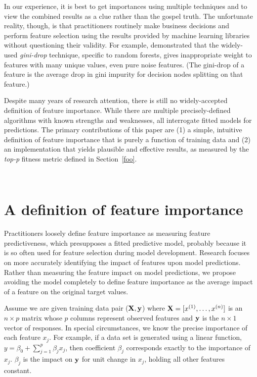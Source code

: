 \documentclass[12pt]{article}
\newcommand{\secref}[1]{Section~\ref{#1}}
\newcommand{\todo}[1]{{{\color{red}{[#1]}}}}
\begin{document}
In our experience, it is best to get importances using multiple techniques and to view the combined results as a clue rather than the gospel truth.  The unfortunate reality, though, is that practitioners routinely make business decisions and  perform feature selection using the results provided by machine learning libraries without questioning their validity.  For example, \cite{rfpimp} demonstrated that the widely-used {\em gini-drop} technique, specific to random forests, gives inappropriate weight to features with many unique values, even pure noise features. (The gini-drop of a feature is the average drop in gini impurity for decision nodes splitting on that feature.) \todo{transition}

Despite many years of research attention, there is still no widely-accepted definition of feature importance. While there are multiple precisely-defined algorithms with known strengths and weaknesses, all interrogate fitted models for predictions. The primary contributions of this paper are (1) a simple, intuitive definition of feature importance that is purely a function of training data and (2) an implementation that yields plausible and effective results, as measured by the {\em top-p} fitness metric defined in \secref{foo}.

~\\
\noindent \todo{Likely a good spot for a paper walk-through}

\section{A definition of feature importance}\label{sec:def}

Practitioners loosely define feature importance as measuring feature predictiveness, which presupposes a fitted predictive model, probably because it is so often used for feature selection during model development.  Research  focuses on more accurately identifying the impact of features upon model predictions. Rather than measuring the feature impact on model predictions, we propose avoiding the model completely to define feature importance as the  average impact of a feature on the original target values.

Assume we are given training data pair ($\bf X, y$) where ${\bf X} = [x^{(1)}, \ldots, x^{(n)}]$ is an $n \times p$ matrix whose $p$ columns represent observed features and ${\bf y}$ is the $n \times 1$ vector of responses. In special circumstances, we know the precise importance of each feature $x_j$.  For example, if a data set is generated using a linear function, $y = \beta_0 + \sum_{j=1}^p \beta_j x_j$, \todo{assumes independence of $x_j$?} then coefficient $\beta_j$ corresponds exactly to the importance of $x_j$.  $\beta_j$ is the impact on $\bf y$ for unit change in $x_j$, holding all other features constant.
\end{document}
